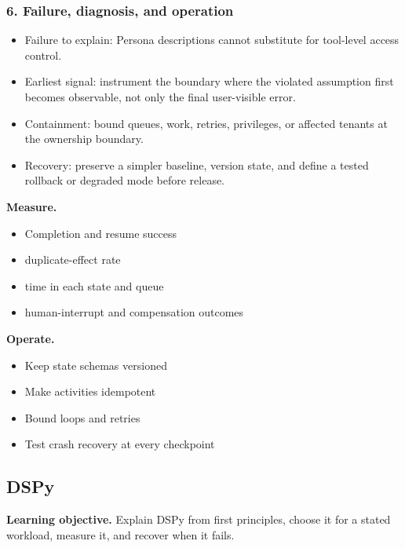 \subsubsection*{6. Failure, diagnosis, and operation}
\begin{itemize}
\item Failure to explain: Persona descriptions cannot substitute for tool-level access control.
\item Earliest signal: instrument the boundary where the violated assumption first becomes observable, not only the final user-visible error.
\item Containment: bound queues, work, retries, privileges, or affected tenants at the ownership boundary.
\item Recovery: preserve a simpler baseline, version state, and define a tested rollback or degraded mode before release.
\end{itemize}
\textbf{Measure.}\begin{itemize}
\item Completion and resume success
\item duplicate-effect rate
\item time in each state and queue
\item human-interrupt and compensation outcomes
\end{itemize}
\textbf{Operate.}\begin{itemize}
\item Keep state schemas versioned
\item Make activities idempotent
\item Bound loops and retries
\item Test crash recovery at every checkpoint
\end{itemize}
\subsection{DSPy}
\textbf{Learning objective.} Explain DSPy from first principles, choose it for a stated workload, measure it, and recover when it fails.
